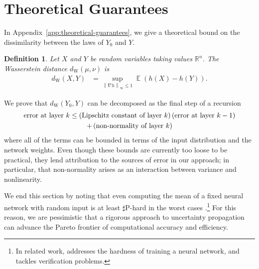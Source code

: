 \documentclass{article}
\newtheorem{definition}{Definition}
\DeclareMathOperator{\expect}{\mathbb{E}}
\begin{document}
\section{Theoretical Guarantees}
In Appendix~\ref{app:theoretical-guarantees}, we give a theoretical bound on the dissimilarity between the laws of \(Y_0\) and \(Y\).

\begin{definition}
Let \(X\) and \(Y\) be random variables taking values  \(\mathbb{R}^n\).
The Wasserstein distance \(d_\text{W} (\mu, \nu)\) is 
\begin{align*}
  d_\mathrm{W}(X, Y) &= \sup_{\left\|\nabla h\right\|_{\infty} \leq 1} \expect (h(X) - h(Y)).
\end{align*}
\end{definition}

We prove that \(d_\mathrm{W}(Y_0, Y)\) can be decomposed as
the final step of a recursion
\begin{multline}
  \text{error at layer \(k\)}
  \leq \del{\text{Lipschitz constant of layer \(k\)}} \del{\text{error at layer \(k-1\)}}
  \\
  + \del{\text{non-normality of layer \(k\)}}
\end{multline}
where all of the terms can be bounded in terms of the input distribution and the network weights.
Even though these bounds are currently too loose to be practical, they lend attribution to the sources of error in our approach; in particular, that non-normality arises as an interaction between variance and nonlinearity.

We end this section by noting that even computing the mean of a fixed neural network with random input is at least \(\sharp\)P-hard in the worst cases \citet{feischl_computational_2025}.\footnote{In related work, \citet{abrahamsen_training_2021} addresses the hardness of training a neural network, and \citet{baluta_quantitative_2019} tackles verification problems.}
For this reason, we are pessimistic that a rigorous approach to uncertainty propagation can advance the Pareto frontier of computational accuracy and efficiency.
\end{document}
